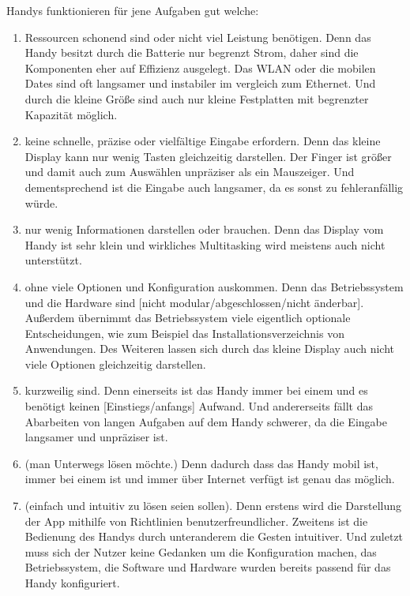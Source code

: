%
\myNewSection
Handys funktionieren für jene Aufgaben gut welche:
\begin{enumerate}
	\item Ressourcen schonend sind oder nicht viel Leistung benötigen.\newline%
	Denn das Handy besitzt durch die Batterie nur begrenzt Strom, daher sind die Komponenten eher auf Effizienz ausgelegt. Das WLAN oder die mobilen Dates sind oft langsamer und instabiler im vergleich zum Ethernet. Und durch die kleine Größe sind auch nur kleine Festplatten mit begrenzter Kapazität möglich.%
	\item keine schnelle, präzise oder vielfältige Eingabe erfordern.\newline%
	Denn das kleine Display kann nur wenig Tasten gleichzeitig darstellen. Der Finger ist größer und damit auch zum Auswählen unpräziser als ein Mauszeiger. Und dementsprechend ist die Eingabe auch langsamer, da es sonst zu fehleranfällig würde.%
	\item nur wenig Informationen darstellen oder brauchen.\newline%
	Denn das Display vom Handy ist sehr klein und wirkliches Multitasking wird meistens auch nicht unterstützt.%
	\item ohne viele Optionen und Konfiguration auskommen.\newline%
	Denn das Betriebssystem und die Hardware sind [nicht modular/abgeschlossen/nicht änderbar]. Außerdem übernimmt das Betriebssystem viele eigentlich optionale Entscheidungen, wie zum Beispiel das Installationsverzeichnis von Anwendungen. Des Weiteren lassen sich durch das kleine Display auch nicht viele Optionen gleichzeitig darstellen.%
	\item kurzweilig sind.\newline%
	Denn einerseits ist das Handy immer bei einem und es benötigt keinen [Einstiegs/anfangs] Aufwand. Und andererseits fällt das Abarbeiten von langen Aufgaben auf dem Handy schwerer, da die Eingabe langsamer und unpräziser ist.%
	\item (man Unterwegs lösen möchte.)\newline%
	Denn dadurch dass das Handy mobil ist, immer bei einem ist und immer über Internet verfügt ist genau das möglich.%
	\item (einfach und intuitiv zu lösen seien sollen).\newline%
	Denn erstens wird die Darstellung der App mithilfe von Richtlinien benutzerfreundlicher. Zweitens ist die Bedienung des Handys durch unteranderem die Gesten intuitiver. Und zuletzt muss sich der Nutzer keine Gedanken um die Konfiguration machen, das Betriebssystem, die Software und Hardware wurden bereits passend für das Handy konfiguriert.%
\end{enumerate}

